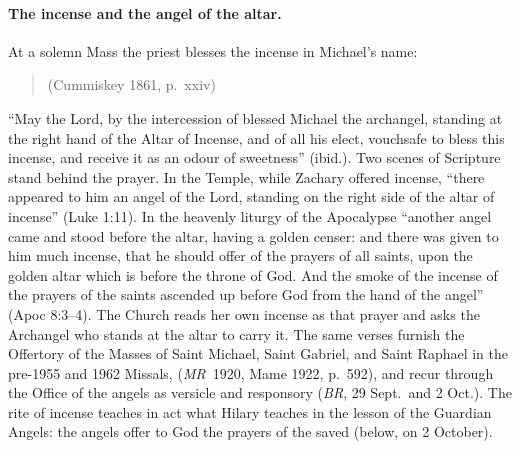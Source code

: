 \paragraph{The incense and the angel of the altar.} At a solemn Mass the
priest blesses the incense in Michael's name:
\begin{quote}
 (Cummiskey 1861, p.~xxiv)
\end{quote}
``May the Lord, by the intercession of blessed Michael the archangel,
standing at the right hand of the Altar of Incense, and of all his elect,
vouchsafe to bless this incense, and receive it as an odour of
sweetness'' (ibid.). Two scenes of Scripture stand behind the prayer. In
the Temple, while Zachary offered incense, ``there appeared to him an
angel of the Lord, standing on the right side of the altar of incense''
(Luke 1:11). In the heavenly liturgy of the Apocalypse ``another angel
came and stood before the altar, having a golden censer: and there was
given to him much incense, that he should offer of the prayers of all
saints, upon the golden altar which is before the throne of God. And the
smoke of the incense of the prayers of the saints ascended up before God
from the hand of the angel'' (Apoc 8:3--4). The Church reads her own
incense as that prayer and asks the Archangel who stands at the altar to
carry it. The same verses furnish the Offertory of the Masses of Saint
Michael, Saint Gabriel, and Saint Raphael in the pre-1955 and 1962
Missals,  (\emph{MR}~1920, Mame 1922, p.~592), and recur
through the Office of the angels as versicle and responsory (\emph{BR},
29 Sept.\ and 2 Oct.). The rite of incense teaches in act what Hilary
teaches in the lesson of the Guardian Angels: the angels offer to God the
prayers of the saved (below, on 2 October).

